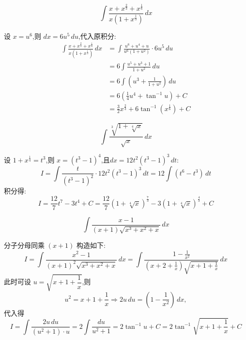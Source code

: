 \begin{questions}
    \question
    \[
    \int \frac{x+x^{\frac{2}{3}}+x^{\frac{1}{6}}}{x(1+x^{\frac{1}{3}})} \, dx
    \]
    \begin{solution}
        设 $x = u^6$,则 $dx = 6u^5 \, du$,代入原积分:
        \begin{align*}
        \int \frac{x+x^{\frac{2}{3}}+x^{\frac{1}{6}}}{x(1+x^{\frac{1}{3}})} \, dx 
        &= \int \frac{u^6+u^4+u}{u^6(1+u^2)} \cdot 6u^5 \, du \\
        &= 6 \int \frac{u^5+u^3+1}{1+u^2} \, du \\
        &= 6 \int \left( u^3 + \frac{1}{1+u^2} \right) \, du \\
        &= 6 \left( \frac{1}{4}u^4 + \tan^{-1} u \right) + C \\
        &= \frac{3}{2}x^{\frac{2}{3}} + 6\tan^{-1}(x^{\frac{1}{6}}) + C
        \end{align*}
    \end{solution}

    \question
    \[
    \int \frac{\sqrt[3]{1+\sqrt[4]{x}}}{\sqrt{x}} \, dx
    \]
    \begin{solution}
        设 $1+x^{\frac{1}{4}} = t^3$,则 $x = (t^3-1)^4$,且$dx = 12t^2(t^3-1)^3 \, dt$:
        \[
        I = \int \frac{t}{(t^3-1)^2} \cdot 12t^2(t^3-1)^3 \, dt = 12 \int (t^6-t^3) \, dt
        \]
        积分得:
        \[
        I = \frac{12}{7}t^7 - 3t^4 + C = \frac{12}{7}(1+\sqrt[4]{x})^{\frac{7}{3}} - 3(1+\sqrt[4]{x})^{\frac{4}{3}} + C
        \]
    \end{solution}

    \question
    \[
    \int \frac{x-1}{(x+1)\sqrt{x^3+x^2+x}} \, dx
    \]
    \begin{solution}
        分子分母同乘 $(x+1)$ 构造如下:
        \[
        I = \int \frac{x^2-1}{(x+1)^2 \sqrt{x^3+x^2+x}} \, dx = \int \frac{1-\frac{1}{x^2}}{(x+2+\frac{1}{x})\sqrt{x+1+\frac{1}{x}}} \, dx
        \]
        此时可设 $u = \sqrt{x+1+\dfrac{1}{x}}$,则 
        \[
        u^2 = x+1+\frac{1}{x} \Rightarrow 2u \, du = \left(1-\frac{1}{x^2}\right) \, dx,
        \]
        代入得
        \[
        I = \int \frac{2u \, du}{(u^2+1) \cdot u} = 2 \int \frac{du}{u^2+1} = 2\tan^{-1} u + C = 2 \tan^{-1} \sqrt{x+1+\frac{1}{x}} + C
        \]
    \end{solution}


\end{questions}
